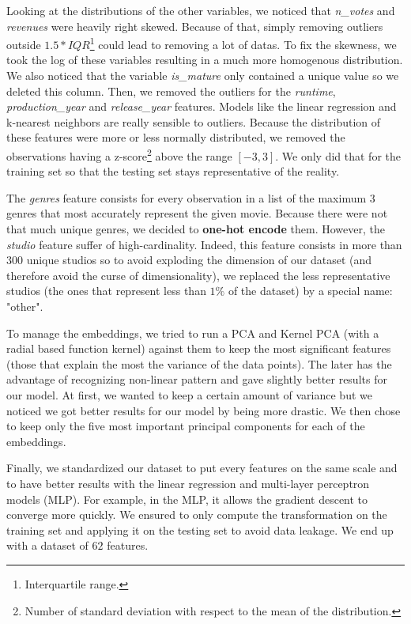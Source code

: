Looking at the distributions of the other variables, we noticed that \textit{n\_votes} and \textit{revenues} were heavily right skewed. Because of that, simply removing outliers outside $1.5 * IQR$\footnote{Interquartile range.} could lead to removing a lot of datas. To fix the skewness, we took the log of these variables resulting in a much more homogenous distribution. We also noticed that the variable \textit{is\_mature} only contained a unique value so we deleted this column. Then, we removed the outliers for the \textit{runtime}, \textit{production\_year} and \textit{release\_year} features. Models like the linear regression and k-nearest neighbors are really sensible to outliers. Because the distribution of these features were more or less normally distributed, we removed the observations having a z-score\footnote{Number of standard deviation with respect to the mean of the distribution.} above the range $[-3, 3]$. We only did that for the training set so that the testing set stays representative of the reality. 

The \textit{genres} feature consists for every observation in a list of the maximum $3$ genres that most accurately represent the given movie. Because there were not that much unique genres, we decided to \textbf{one-hot encode} them. However, the \textit{studio} feature suffer of high-cardinality. Indeed, this feature consists in more than $300$ unique studios so to avoid exploding the dimension of our dataset (and therefore avoid the curse of dimensionality), we replaced the less representative studios (the ones that represent less than $1\%$ of the dataset) by a special name: "other". 

To manage the embeddings, we tried to run a PCA and Kernel PCA (with a radial based function kernel) against them to keep the most significant features (those that explain the most the variance of the data points). The later has the advantage of recognizing non-linear pattern and gave slightly better results for our model. At first, we wanted to keep a certain amount of variance but we noticed we got better results for our model by being more drastic. We then chose to keep only the five most important principal components for each of the embeddings.

Finally, we standardized our dataset to put every features on the same scale and to have better results with the linear regression and multi-layer perceptron models (MLP). For example, in the MLP, it allows the gradient descent to converge more quickly. We ensured to only compute the transformation on the training set and applying it on the testing set to avoid data leakage.
We end up with a dataset of $62$ features.